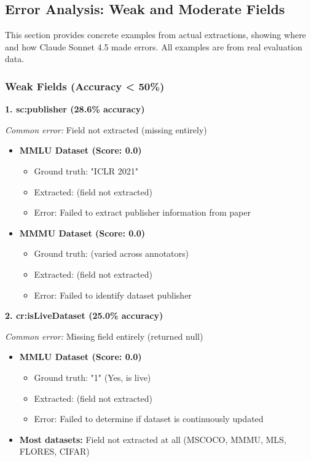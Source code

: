 \documentclass[11pt,a4paper]{article}
\begin{document}
\subsection{Error Analysis: Weak and Moderate Fields}

This section provides concrete examples from actual extractions, showing where and how Claude Sonnet 4.5 made errors. All examples are from real evaluation data.

\subsubsection{Weak Fields (Accuracy < 50\%)}

\textbf{1. sc:publisher (28.6\% accuracy)}

\textit{Common error:} Field not extracted (missing entirely)

\begin{itemize}[leftmargin=*]
    \item \textbf{MMLU Dataset (Score: 0.0)}
    \begin{itemize}
        \item Ground truth: "ICLR 2021"
        \item Extracted: (field not extracted)
        \item Error: Failed to extract publisher information from paper
    \end{itemize}

    \item \textbf{MMMU Dataset (Score: 0.0)}
    \begin{itemize}
        \item Ground truth: (varied across annotators)
        \item Extracted: (field not extracted)
        \item Error: Failed to identify dataset publisher
    \end{itemize}
\end{itemize}

\textbf{2. cr:isLiveDataset (25.0\% accuracy)}

\textit{Common error:} Missing field entirely (returned null)

\begin{itemize}[leftmargin=*]
    \item \textbf{MMLU Dataset (Score: 0.0)}
    \begin{itemize}
        \item Ground truth: "1" (Yes, is live)
        \item Extracted: (field not extracted)
        \item Error: Failed to determine if dataset is continuously updated
    \end{itemize}

    \item \textbf{Most datasets:} Field not extracted at all (MSCOCO, MMMU, MLS, FLORES, CIFAR)
\end{itemize}
\end{document}
